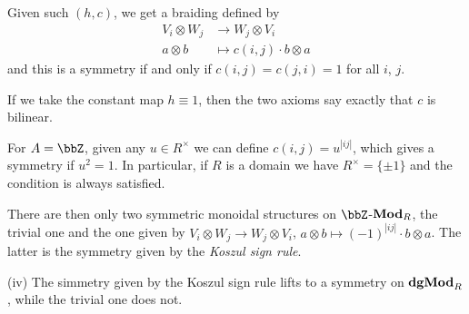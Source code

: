 \documentclass[a4paper,11pt,oneside,openany]{scrbook}
\begin{document}
\begin{exmp}
Given such $(h,c)$, we get a braiding defined by
\begin{align*}
    V_i\otimes W_j &\rightarrow W_j\otimes V_i \\
    a\otimes b &\mapsto c(i,j)\cdot b\otimes a
\end{align*}
and this is a symmetry if and only if $c(i,j)=c(j,i)=1$ for all $i$, $j$.

If we take the constant map $h\equiv 1$, then the two axioms say exactly that $c$ is bilinear.

For $A=\bbZ$, given any $u\in R^\times$ we can define $c(i,j)=u^{|ij|}$, which gives a symmetry if $u^2=1$. In particular, if $R$ is a domain we have $R^\times=\{\pm 1\}$ and the condition is always satisfied.

There are then only two symmetric monoidal structures on $\bbZ$-${\normalfont\textbf{Mod}}_R$, the trivial one and the one given by $V_i\otimes W_j\rightarrow W_j\otimes V_i$, $a\otimes b\mapsto (-1)^{|ij|}\cdot b\otimes a$. The latter is the symmetry given by the \emph{Koszul sign rule}.

\item[(iv)] The simmetry given by the Koszul sign rule lifts to a symmetry on ${\normalfont\textbf{dgMod}}_R$, while the trivial one does not.
\end{exmp}
\end{document}
